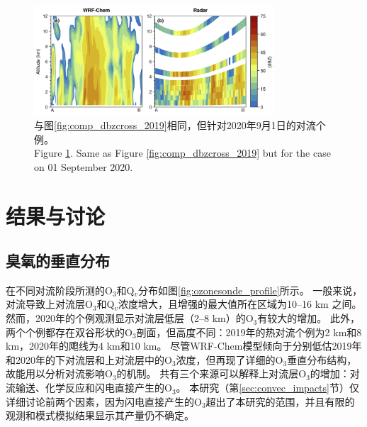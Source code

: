 \begin{figure}[!htbp]
\centering
\includegraphics[width=0.8\textwidth]{./figures/comp_dbzcross_2019.png}
\caption{与图\ref{fig:comp_dbzcross_2019}相同，但针对2020年9月1日的对流个例。\\
Figure \ref{fig:comp_dbzcross_2020}. Same as Figure \ref{fig:comp_dbzcross_2019} but for the case on 01 September 2020.}
\label{fig:comp_dbzcross_2020}
\end{figure}



\section{结果与讨论}

\subsection{臭氧的垂直分布} \label{sec:o3_profile}

在不同对流阶段所测的O$_3$和Q$_v$分布如图\ref{fig:ozonesonde_profile}所示。
一般来说，对流导致上对流层O$_3$和Q$_v$浓度增大，且增强的最大值所在区域为10--16 km 之间。
然而，2020年的个例观测显示对流层低层（2--8 km）的O$_3$有较大的增加。
此外，两个个例都存在双谷形状的O$_3$剖面，但高度不同：2019年的热对流个例为2 km和8 km，2020年的飑线为4 km和10 km。
尽管WRF-Chem模型倾向于分别低估2019年和2020年的下对流层和上对流层中的O$_3$浓度，但再现了详细的O$_3$垂直分布结构，故能用以分析对流影响O$_3$的机制。
共有三个来源可以解释上对流层O$_3$的增加：对流输送、化学反应和闪电直接产生的O$_3$。
本研究（第\ref{sec:convec_impacts}节）仅详细讨论前两个因素，因为闪电直接产生的O$_3$超出了本研究的范围，并且有限的观测和模式模拟结果显示其产量仍不确定\citep{Morris.2010,Ripoll.2014}。


